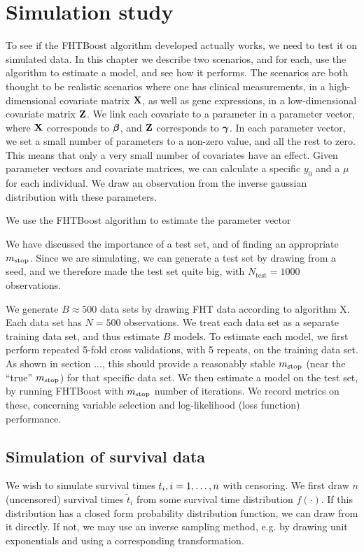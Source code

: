 \chapter{Simulation study}
To see if the FHTBoost algorithm developed actually works, we need to test it on simulated data. In this chapter we describe two scenarios,
and for each, use the algorithm to estimate a model, and see how it performs. The scenarios are both thought to be realistic scenarios
where one has clinical measurements, in a high-dimensional covariate matrix $\mathbf{X}$, as well as gene expressions,
in a low-dimensional covariate matrix $\mathbf{Z}$. We link each covariate to a parameter in a parameter vector,
where $\mathbf{X}$ corresponds to $\boldsymbol{\beta}$, and $\mathbf{Z}$ corresponds to $\boldsymbol{\gamma}$. In each parameter vector, we set a small number of parameters
to a non-zero value, and all the rest to zero. This means that only a very small number of covariates have an effect.
Given parameter vectors and covariate matrices, we can calculate a specific $y_0$ and a $\mu$ for each individual.
We draw an observation from the inverse gaussian distribution with these parameters.

We use the FHTBoost algorithm to estimate the parameter vector

We have discussed the importance of a test set, and of finding an appropriate $m_{\text{stop}}$. Since we are simulating, we can generate a test set
by drawing from a seed, and we therefore made the test set quite big, with $N_{\text{test}}=1000$ observations.

We generate $B\approx500$ data sets by drawing FHT data according to algorithm X. Each data set has $N=500$ observations. 
We treat each data set as a separate training data set, and thus estimate $B$ models.
To estimate each model, we first perform repeated 5-fold cross validations, with 5 repeats, on the training data set.
As shown in section ..., this should provide a reasonably stable $m_{\text{stop}}$ (near the ``true'' $m_{\text{stop}}$) for that specific data set.
We then estimate a model on the test set, by running FHTBoost with $m_{\text{stop}}$ number of iterations. We record metrics on these,
concerning variable selection and log-likelihood (loss function) performance.

\section{Simulation of survival data}
We wish to simulate survival times $t_{i},i=1,\ldots,n$ with censoring. We first draw $n$ (uncensored) survival times $\tilde{t}_i$ from some survival time distribution $f(\cdot)$. If this distribution has a closed form probability distribution function, we can draw from it directly. If not, we may use an inverse sampling method, e.g. by drawing unit exponentials and using a corresponding transformation.

